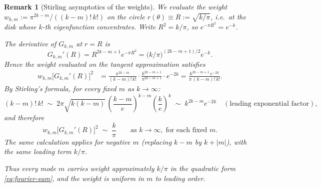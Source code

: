 \documentclass[a4paper,11pt,reqno]{amsart}
\newtheorem{remark}{Remark}[section]
\begin{document}
\begin{remark}[Stirling asymptotics of the weights]
\label{rem:stirling}
We evaluate the weight $w_{k,m}:=\pi^{2k-m}/((k-m)!\,k!)$ on the circle
$r(\theta)\equiv R:=\sqrt{k/\pi}$, i.e.\ at the disk whose $k$-th eigenfunction
concentrates. Write $R^2=k/\pi$, so $e^{-\pi R^2}=e^{-k}$.

The derivative of $G_{k,m}$ at $r=R$ is
\[
G_{k,m}'(R)=R^{2k-m+1}e^{-\pi R^2}=\bigl(k/\pi\bigr)^{(2k-m+1)/2}e^{-k}.
\]
Hence the weight evaluated on the tangent approximation satisfies
\begin{align*}
w_{k,m}\bigl[G_{k,m}'(R)\bigr]^2
&=\frac{\pi^{2k-m}}{(k-m)!\,k!}
\cdot\frac{k^{2k-m+1}}{\pi^{2k-m+1}}\cdot e^{-2k}
=\frac{k^{2k-m+1}\,e^{-2k}}{\pi\,(k-m)!\,k!}.
\end{align*}
By Stirling's formula, for every fixed $m$ as $k\to\infty$:
\[
(k-m)!\,k!\;\sim\;2\pi\sqrt{k(k-m)}\,\left(\frac{k-m}{e}\right)^{k-m}
\!\!\left(\frac{k}{e}\right)^k
\;\sim\;k^{2k-m}e^{-2k}\quad(\text{leading exponential factor}),
\]
and therefore
\begin{equation}\label{eq:stirling-weight}
w_{k,m}\bigl[G_{k,m}'(R)\bigr]^2\;\sim\;\frac{k}{\pi}
\qquad\text{as }k\to\infty,\;\text{for each fixed }m.
\end{equation}
The same calculation applies for negative $m$ (replacing $k-m$ by $k+|m|$),
with the same leading term $k/\pi$.

Thus every mode $m$ carries weight approximately $k/\pi$ in the quadratic form
\eqref{eq:fourier-sum}, and the weight is \emph{uniform} in $m$ to leading order.
\end{remark}
\end{document}
